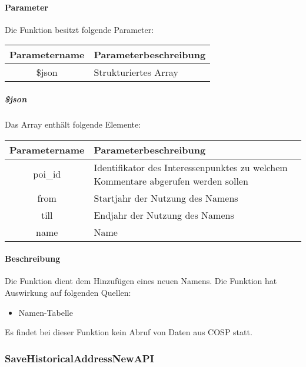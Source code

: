 \paragraph{Parameter} Die Funktion besitzt folgende Parameter:
\begin{table}[H]
	\begin{tabular}{|c|p{11cm}|}
		\hline
		\textbf{Parametername} & \textbf{Parameterbeschreibung} \\ \hline
		\$json & Strukturiertes Array \\ \hline
	\end{tabular}
\end{table}
\subparagraph{\$json}Das Array enthält folgende Elemente:
\begin{table}[H]
	\begin{tabular}{|c|p{11cm}|}
		\hline
		\textbf{Parametername} & \textbf{Parameterbeschreibung} \\ \hline
		poi\_id & Identifikator des Interessenpunktes zu welchem Kommentare abgerufen werden sollen \\ \hline
		from & Startjahr der Nutzung des Namens \\ \hline
		till & Endjahr der Nutzung des Namens \\ \hline
		name & Name \\ \hline
	\end{tabular}
\end{table}
\paragraph{Beschreibung} Die Funktion dient dem Hinzufügen eines neuen Namens. Die Funktion hat Auswirkung auf folgenden Quellen:
\begin{itemize}
	\item Namen-Tabelle
\end{itemize}
Es findet bei dieser Funktion kein Abruf von Daten aus {\glqq COSP\grqq} statt.
\subsubsection{SaveHistoricalAddressNewAPI}
